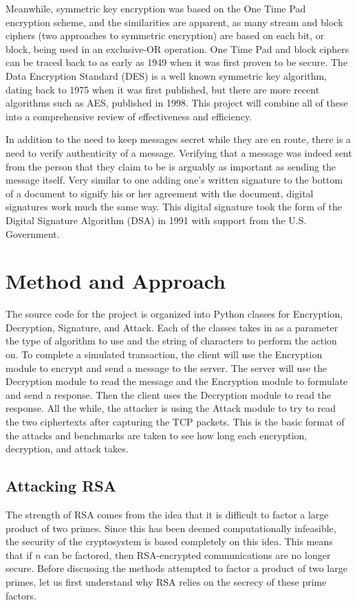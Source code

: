 \documentclass[12pt]{report}
\begin{document}
Meanwhile, symmetric key encryption was based on the One Time Pad encryption scheme, and the similarities are apparent, as many stream and block ciphers (two
approaches to symmetric encryption) are based on each bit, or block, being used in an exclusive-OR operation. One Time Pad and block ciphers can be traced back
to as early as 1949 when it was first proven to be secure. The Data Encryption Standard (DES) is a well known symmetric key algorithm, dating back to 1975 when
it was first published, but there are more recent algorithms such as AES, published in 1998. This project will combine all of these into a comprehensive review
of effectiveness and efficiency.

In addition to the need to keep messages secret while they are en route, there is a need to verify authenticity of a message. Verifying that a message was indeed
sent from the person that they claim to be is arguably as important as sending the message itself. Very similar to one adding one's written signature to the bottom
of a document to signify his or her agreement with the document, digital signatures work much the same way. This digital signature took the form of the Digital
Signature Algorithm (DSA) in 1991 with support from the U.S. Government.\cite{mit}\cite{dsa}

\section{Method and Approach}
The source code for the project is organized into Python classes for Encryption, Decryption, Signature, and Attack. Each of the classes takes in as a parameter the type of algorithm to use and
the string of characters to perform the action on. To complete a simulated transaction, the client will use the Encryption module to encrypt and send a message to the server. The server will use
the Decryption module to read the message and the Encryption module to formulate and send a response. Then the client uses the Decryption module to read the response. All the while, the attacker
is using the Attack module to try to read the two ciphertexts after capturing the TCP packets. This is the basic format of the attacks and benchmarks are taken to see how long each encryption,
decryption, and attack takes.

\subsection{Attacking RSA}
The strength of RSA comes from the idea that it is difficult to factor a large product of two primes. Since this has been deemed computationally infeasible, the security of the cryptosystem is
based completely on this idea. This means that if $n$ can be factored, then RSA-encrypted communications are no longer secure. Before discussing the methods attempted to factor a product of two
large primes, let us first understand why RSA relies on the secrecy of these prime factors.
\end{document}
